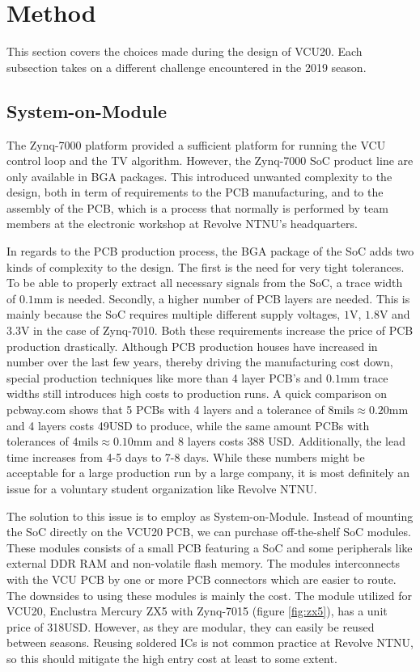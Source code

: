 \section{Method}

This section covers the choices made during the design of VCU20. Each subsection takes on a different challenge encountered in the 2019 season.

\subsection{System-on-Module}

The Zynq-7000 platform provided a sufficient platform for running the VCU control loop and the TV algorithm. However, the Zynq-7000 SoC product line are only available in BGA packages. This introduced unwanted complexity to the design, both in term of requirements to the PCB manufacturing, and to the assembly of the PCB, which is a process that normally is performed by team members at the electronic workshop at Revolve NTNU's headquarters. 

In regards to the PCB production process, the BGA package of the SoC adds two kinds of complexity to the design. The first is the need for very tight tolerances. To be able to properly extract all necessary signals from the SoC, a trace width of $0.1\si{\milli\metre}$ is needed. Secondly, a higher number of PCB layers are needed. This is mainly because the SoC requires multiple different supply voltages, $1\si{\volt}$, $1.8\si{\volt}$ and $3.3\si{\volt}$ in the case of Zynq-7010. Both these requirements increase the price of PCB production drastically. Although PCB production houses have increased in number over the last few years, thereby driving the manufacturing cost down, special production techniques like more than 4 layer PCB's and $0.1\si{\milli\metre}$ trace widths still introduces high costs to production runs. A quick comparison on pcbway.com shows that 5 PCBs with 4 layers and a tolerance of $8\textrm{mils}\approx0.20\si{\milli\metre}$ and 4 layers costs 49USD to produce, while the same amount PCBs with tolerances of $4\textrm{mils}\approx0.10\si{\milli\metre}$ and 8 layers costs 388 USD. Additionally, the lead time increases from 4-5 days to 7-8 days. While these numbers might be acceptable for a large production run by a large company, it is most definitely an issue for a voluntary student organization like Revolve NTNU. 

The solution to this issue is to employ as System-on-Module. Instead of mounting the SoC directly on the VCU20 PCB, we can purchase off-the-shelf SoC modules. These modules consists of a small PCB featuring a SoC and some peripherals like external DDR RAM and non-volatile flash memory. The modules interconnects with the VCU PCB by one or more PCB connectors which are easier to route. The downsides to using these modules is mainly the cost. The module utilized for VCU20, Enclustra Mercury ZX5 with Zynq-7015 (figure \ref{fig:zx5}), has a unit price of 318USD. However, as they are modular, they can easily be reused between seasons. Reusing soldered ICs is not common practice at Revolve NTNU, so this should mitigate the high entry cost at least to some extent.

